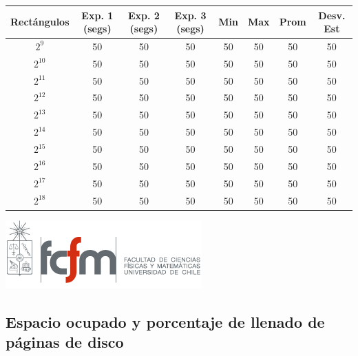 \documentclass[letterpaper,10pt]{article}
\begin{document}
	\begin{center}

		\begin{tabular}{|c|c|c|c|c|c|c|c|}
			\hline
			Rectángulos	& Exp. 1 (segs) & Exp. 2 (segs) & Exp. 3 (segs) & Min & Max & Prom & Desv. Est\\
			\hline
			$2^{9}$ 	& 50 	& 50 	& 50 	& 50 	& 50 	& 50 	& 50 \\
			\hline
			$2^{10}$ 	& 50 	& 50 	& 50 	& 50 	& 50 	& 50 	& 50 \\
			\hline
			$2^{11}$ 	& 50 	& 50 	& 50 	& 50 	& 50 	& 50 	& 50 \\
			\hline
			$2^{12}$ 	& 50 	& 50 	& 50 	& 50 	& 50 	& 50 	& 50 \\
			\hline
			$2^{13}$ 	& 50 	& 50 	& 50 	& 50 	& 50 	& 50 	& 50 \\
			\hline
			$2^{14}$ 	& 50 	& 50 	& 50 	& 50 	& 50 	& 50 	& 50 \\
			\hline
			$2^{15}$ 	& 50 	& 50 	& 50 	& 50 	& 50 	& 50 	& 50 \\
			\hline
			$2^{16}$ 	& 50 	& 50 	& 50 	& 50 	& 50 	& 50 	& 50 \\
			\hline
			$2^{17}$ 	& 50 	& 50 	& 50 	& 50 	& 50 	& 50 	& 50 \\
			\hline
			$2^{18}$ 	& 50 	& 50 	& 50 	& 50 	& 50 	& 50 	& 50 \\
			\hline
		\end{tabular}

		\includegraphics{logoFCFM.png}
	\end{center}

	\subsection{Espacio ocupado y porcentaje de llenado de páginas de disco}
\end{document}
